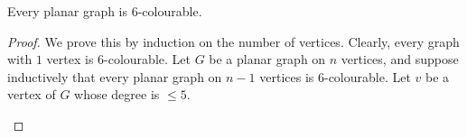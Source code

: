 \begin{thmbox}
    \begin{theorem}
        Every planar graph is $ 6 $-colourable.
    \end{theorem}
\end{thmbox}
\begin{proof}
    We prove this by induction on the number of vertices. Clearly,
    every graph with $ 1 $ vertex is $ 6 $-colourable. Let $ G $
    be a planar graph on $ n $ vertices, and suppose inductively
    that every planar graph on $ n-1 $ vertices is $ 6 $-colourable.
    Let $ v $ be a vertex of $ G $ whose degree is $ \leqslant 5 $.




    \begin{center}
        \begin{tikzpicture}[x=0.75pt,y=0.75pt,yscale=-1,xscale=1]


\end{tikzpicture}
\end{center}
\end{proof}
